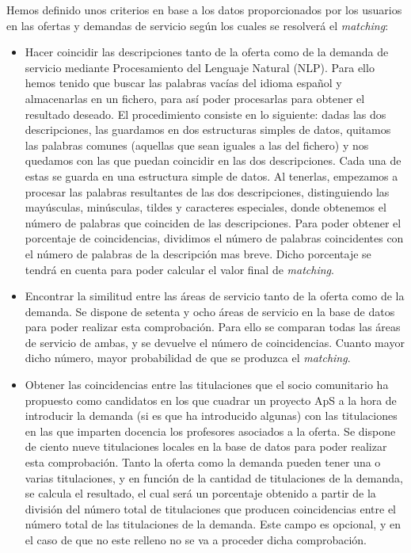 \documentclass[11pt]{book}
\begin{document}
Hemos definido unos criterios en base a los datos proporcionados por los usuarios en las ofertas y demandas de servicio según los cuales se resolverá el \emph{matching}:

\begin{itemize} 	
	\item Hacer coincidir las descripciones tanto de la oferta como de la demanda de servicio mediante Procesamiento del Lenguaje Natural (NLP).
	Para ello hemos tenido que buscar las palabras vacías del idioma español y almacenarlas en un fichero, para así poder  procesarlas para obtener el resultado deseado. El procedimiento consiste en lo siguiente: dadas las dos descripciones, las guardamos en dos estructuras simples de datos, quitamos las palabras comunes (aquellas que sean iguales a las del fichero) y nos quedamos con las que puedan coincidir en las dos descripciones. Cada una de estas se guarda en una estructura simple de datos. Al tenerlas, empezamos a procesar las palabras resultantes de las dos descripciones, distinguiendo las mayúsculas, minúsculas, tildes y caracteres especiales, donde obtenemos el número de palabras que coinciden de las descripciones. Para poder obtener el porcentaje de coincidencias, dividimos el número de palabras coincidentes con el número de palabras de la descripción mas breve. Dicho porcentaje se tendrá en cuenta para poder calcular el valor final de \emph{matching}.
	
	\item Encontrar la similitud entre las áreas de servicio tanto de la oferta como de la demanda. Se dispone de setenta y ocho áreas de servicio en la base de datos para poder realizar esta comprobación. Para ello se comparan todas las áreas de servicio de ambas, y se devuelve el número de coincidencias. Cuanto mayor dicho número, mayor probabilidad de que se produzca el \emph{matching}.
	
	\item Obtener las coincidencias entre las titulaciones que el socio
	comunitario ha propuesto como candidatos en los que cuadrar un proyecto
	ApS a la hora de introducir la demanda (si es que ha introducido algunas) con las titulaciones en las que imparten docencia los profesores asociados a la oferta. 
	Se dispone de ciento nueve titulaciones locales en la base de datos para poder realizar esta comprobación. Tanto la oferta como la demanda pueden tener una o varias titulaciones, y en función de la cantidad de titulaciones de la demanda, se calcula el resultado, el cual será un porcentaje obtenido a partir de la división del número total de titulaciones que producen coincidencias entre el  número total de las titulaciones de la demanda. Este campo es opcional, y en el caso de que no este relleno no se va a proceder dicha comprobación.
	

\end{itemize}
\end{document}
